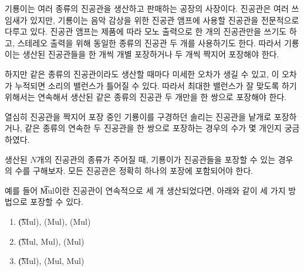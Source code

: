 기룡이는 여러 종류의 진공관을 생산하고 판매하는 공장의 사장이다. 
진공관은 여러 쓰임새가 있지만, 기룡이는 음악 감상을 위한 진공관 앰프에 사용할 진공관을 전문적으로 다루고 있다. 
진공관 앰프는 제품에 따라 모노 출력으로 한 개의 진공관만을 쓰기도 하고, 스테레오 출력을 위해 동일한 종류의 진공관 두 개를 사용하기도 한다. 
따라서 기룡이는 생산된 진공관들을 한 개씩 개별 포장하거나 두 개씩 짝지어 포장해야 한다.

하지만 같은 종류의 진공관이라도 생산할 때마다 미세한 오차가 생길 수 있고, 이 오차가 누적되면 소리의 밸런스가 틀어질 수 있다. 
따라서 최대한 밸런스가 잘 맞도록 하기 위해서는 연속해서 생산된 같은 종류의 진공관 두 개만을 한 쌍으로 포장해야 한다. 

열심히 진공관을 짝지어 포장 중인 기룡이를 구경하던 솔리는 진공관을 낱개로 포장하거나, 같은 종류의 연속한 두 진공관을 한 쌍으로 포장하는 경우의 수가 몇 개인지 궁금하였다.

생산된 $N$개의 진공관의 종류가 주어질 때, 기룡이가 진공관들을 포장할 수 있는 경우의 수를 구해보자. 모든 진공관은 정확히 하나의 포장에 포함되어야 한다.

예를 들어 \t{Mul}이란 진공관이 연속적으로 세 개 생산되었다면, 아래와 같이 세 가지 방법으로 포장할 수 있다.
\begin{enumerate}
  \item \t{(Mul), (Mul), (Mul)}
  \item \t{(Mul, Mul), (Mul)}
  \item \t{(Mul), (Mul, Mul)}
\end{enumerate}